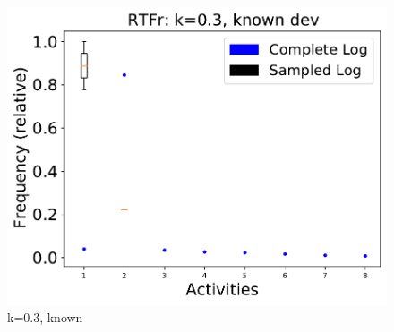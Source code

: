 \documentclass[landscape]{article}
\begin{document}
\begin{figure}[!htb]
\begin{minipage}{0.2\textwidth}
		\includegraphics[width=1.0\textwidth]{../RTFM_model2/RTFM_model2_deviationsApprox_0.3_NONALIGNING_KNOWN.pdf}
		\caption{k=0.3, known}
	\end{minipage}
\end{figure}
\end{document}
